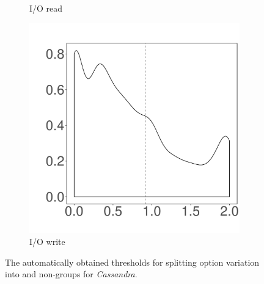 \begin{figure}[t]
\begin{subfigure}{0.19\textwidth}
                \caption{I/O read}
        \end{subfigure}
        \begin{subfigure}{0.19\textwidth}
                \includegraphics[width=\linewidth]{Figures/iowrite-cassandra-cluster.pdf}
                \caption{I/O write}
        \end{subfigure}
        
	\caption{The automatically obtained thresholds for splitting option variation into \inconsistent and non-\inconsistent groups for \emph{Cassandra}.} %
	\label{fig:threshold_cassandra}
\end{figure}



